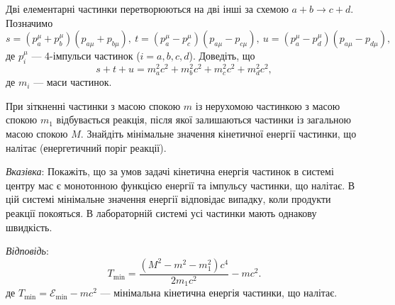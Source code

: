 \begin{problem}
    Дві елементарні частинки перетворюються на дві інші за схемою $a+b\to c+d$. Позначимо
    \begin{equation*}
        s = (p_a^{\mu}+p_b^{\mu})(p_{a\mu}+p_{b\mu}), \
        t = (p_a^{\mu}-p_c^{\mu})(p_{a\mu}-p_{c\mu}), \
        u = (p_a^{\mu}-p_d^{\mu})(p_{a\mu}-p_{d\mu}),
    \end{equation*}
    де $p_i^{\mu}$ --- 4-імпульси частинок ($i=a,b,c,d$). Доведіть, що
    \begin{equation*}
        s + t + u = m_a^2c^2 + m_b^2c^2 + m_c^2c^2 + m_d^2c^2,
    \end{equation*}
    де $m_i$ --- маси частинок.
\end{problem}

\begin{problem}
    При зіткненні частинки з масою спокою $m$ із нерухомою частинкою з масою спокою $m_1$ відбувається реакція, після
    якої залишаються частинки із загальною масою спокою $M$. Знайдіть мінімальне значення кінетичної енергії частинки,
    що налітає (енергетичний поріг реакції).

    \textit{Вказівка}: Покажіть, що за умов задачі кінетична енергія частинок в системі центру мас є монотонною функцією
    енергії та імпульсу частинки, що налітає. В цій системі мінімальне значення енергії відповідає випадку, коли
    продукти реакції покояться. В лабораторній системі усі частинки мають однакову швидкість.

    \textit{Відповідь}:
    \begin{equation*}
        T_{\min} = \frac{(M^2 - m^2 - m_1^2)c^4}{2m_1c^2} - mc^2.
    \end{equation*}
    де $T_{\min} = \mathcal{E}_{\min} - mc^2$ --- мінімальна кінетична енергія частинки, що налітає.
\end{problem}

